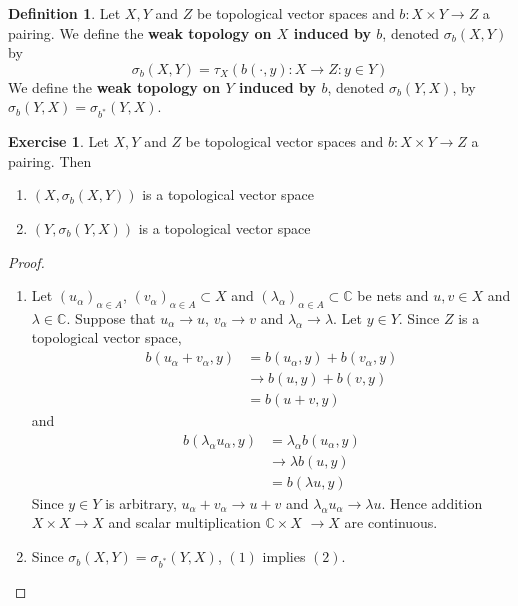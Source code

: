 \documentclass[12pt]{amsart}
\theoremstyle{definition}
\newtheorem{defn}[definition]{Definition}
\newtheorem{ex}[definition]{Exercise}
\newcommand{\al}{\alpha}
\newcommand{\lam}{\lambda}
\newcommand{\sig}{\sigma}
\newcommand{\C}{\mathbb{C}}
\newcommand{\tbf}[1]{\textbf{#1}}
\DeclareMathOperator*{\0}{\mbf{0}}
\DeclareMathOperator*{\1}{\mbf{1}}
\begin{document}
	\begin{defn}
		Let $X,Y$ and $Z$ be topological vector spaces and $b : X \times Y \rightarrow Z$ a pairing. We define the \tbf{weak topology on $X$ induced by $b$}, denoted $\sig_b(X, Y)$ by 
		$$\sig_b(X,Y) = \tau_{X}(b(\cdot, y): X \rightarrow Z: y \in Y)$$ 
		We define the \tbf{weak topology on $Y$ induced by $b$}, denoted $\sig_b(Y, X)$, by $\sig_b(Y,X) = \sig_{b^*}(Y, X)$.
	\end{defn}

	\begin{ex}
		Let $X,Y$ and $Z$ be topological vector spaces and $b : X \times Y \rightarrow Z$ a pairing. Then 
		\begin{enumerate}
			\item $(X, \sig_b(X, Y))$ is a topological vector space
			\item $(Y, \sig_b(Y, X))$ is a topological vector space
		\end{enumerate}
	\end{ex}

	\begin{proof}\
		\begin{enumerate}
			\item Let $(u_{\al})_{\al \in A}$, $(v_{\al})_{\al \in A} \subset X$ and $(\lam_{\al})_{\al \in A} \subset \C$ be nets and $u,v \in X$ and $\lam \in \C$. Suppose that $u_{\al} \rightarrow u$, $v_{\al} \rightarrow v$ and $\lam_{\al} \rightarrow \lam$. Let $y \in Y$. Since $Z$ is a topological vector space,
			\begin{align*}
				b(u_{\al} + v_{\al}, y) 
				& = b(u_{\al}, y) + b( v_{\al}, y) \\
				& \rightarrow b(u, y) + b(v, y) \\
				& = b(u+v, y)
			\end{align*}
		and 
			\begin{align*}
				b(\lam_{\al} u_{\al} , y) 
				& = \lam_{\al} b(u_{\al}, y)\\
				& \rightarrow \lam b(u, y) \\
				& = b(\lam u, y)
			\end{align*}
			Since $y \in Y$ is arbitrary, $u_{\al} + v_{\al} \rightarrow u+v$ and $\lam_{\al}u_{\al} \rightarrow \lam u$. Hence addition $X \times X \rightarrow X$ and scalar multiplication $\C \times X$ $\rightarrow X$ are continuous.
			\item Since $\sig_b(X,Y) = \sig_{b^*}(Y,X)$, $(1)$ implies $(2)$. 
		\end{enumerate}
	\end{proof}
\end{document}
